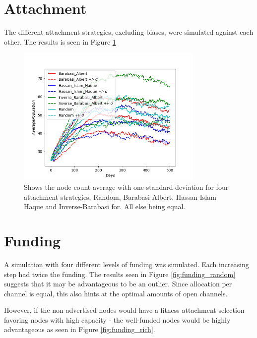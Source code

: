 \section{Attachment}

The different attachment strategies, excluding biases, were simulated against each other. The results is seen in Figure \ref{fig:history_attachment} 

\begin{figure}[!htb]
	
	\hspace*{-0.5cm}
	\centering
	\includegraphics[width=9cm]{images/histories_deviation_attachment.png}
	\caption{ Shows the node count average with one standard deviation for four attachment strategies, Random, Barabasi-Albert, Hassan-Islam-Haque and Inverse-Barabasi for. All else being equal. }
	\label{fig:history_attachment}
	\hspace*{2mm} 
\end{figure}

\section{Funding}

A simulation with four different levels of funding was simulated. Each increasing step had twice the funding. The results seen in Figure \ref{fig:funding_random} suggests that it may be advantageous to be an outlier. Since allocation per channel is equal, this also hints at the optimal amounts of open channels.

However, if the non-advertised nodes would have a fitness attachment selection favoring nodes with high capacity - the well-funded nodes would be highly advantageous as seen in Figure \ref{fig:funding_rich}.  

\newpage

